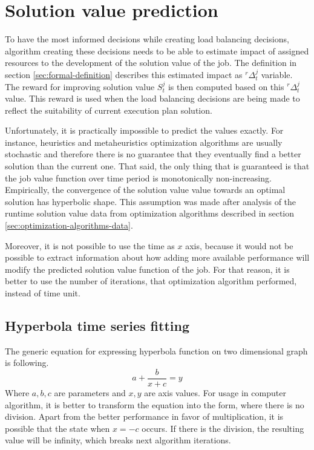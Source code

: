 \section{Solution value prediction}\label{sec:algorithm-value-prediction}

To have the most informed decisions while creating load balancing decisions,
algorithm creating these decisions needs to be able to estimate impact of assigned resources to the development of the solution value of the job.
The definition in section \ref{sec:formal-definition} describes this estimated impact as $^{r}\Delta_{t}^{j}$ variable.
The reward for improving solution value $S_{t}^{j}$ is then computed based on this $^{r}\Delta_{t}^{j}$ value.
This reward is used when the load balancing decisions are being made to reflect the suitability of current execution plan solution.

Unfortunately, 
it is practically impossible to predict the values exactly.
For instance, heuristics and metaheuristics optimization algorithms are usually stochastic 
and therefore there is no guarantee that they eventually find a better solution than the current one.
That said, 
the only thing that is guaranteed is that the job value function over time period is monotonically non-increasing.
Empirically,
the convergence of the solution value value towards an optimal solution has hyperbolic shape.
This assumption was made after analysis of the runtime solution value data from optimization algorithms described in section \ref{sec:optimization-algorithms-data}.

Moreover, 
it is not possible to use the time as $x$ axis,
because it would not be possible to extract information about 
how adding more available performance will modify the predicted solution value function of the job.
For that reason,
it is better to use the number of iterations, that optimization algorithm performed,
instead of time unit.

\subsection{Hyperbola time series fitting}
The generic equation for expressing hyperbola function on two dimensional graph is following.
\begin{equation}
    a + \dfrac{b}{x+c} = y
\end{equation}
Where $a,b,c$ are parameters and $x,y$ are axis values.
For usage in computer algorithm,
it is better to transform the equation into the form, 
where there is no division.
Apart from the better performance in favor of multiplication\cite{LeFevre1999},
it is possible that the state when $x = -c$ occurs.
If there is the division,
the resulting value will be infinity,
which breaks next algorithm iterations.

